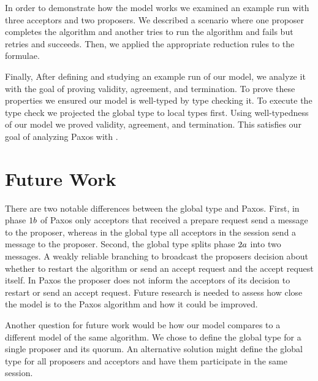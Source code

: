 In order to demonstrate how the model works we examined an example run with three acceptors and two proposers.
We described a scenario where one proposer completes the algorithm and another tries to run the algorithm and fails but retries and succeeds.
Then, we applied the appropriate reduction rules to the formulae.

Finally, After defining and studying an example run of our model, we analyze it with the goal of proving validity, agreement, and termination.
To prove these properties we ensured our model is well-typed by type checking it.
To execute the type check we projected the global type to local types first.
Using well-typedness of our model we proved validity, agreement, and termination.
This satisfies our goal of analyzing Paxos with \FTMPST.

\section{Future Work}
There are two notable differences between the global type and Paxos.
First, in phase $1b$ of Paxos only acceptors that received a prepare request send a message to the proposer, whereas in the global type all acceptors in the session send a message to the proposer.
Second, the global type splits phase $2a$ into two messages.
A weakly reliable branching to broadcast the proposers decision about whether to restart the algorithm or send an accept request and the accept request itself.
In Paxos the proposer does not inform the acceptors of its decision to restart or send an accept request.
Future research is needed to assess how close the model is to the Paxos algorithm and how it could be improved.

Another question for future work would be how our model compares to a different model of the same algorithm.
We chose to define the global type for a single proposer and its quorum.
An alternative solution might define the global type for all proposers and acceptors and have them participate in the same session.
